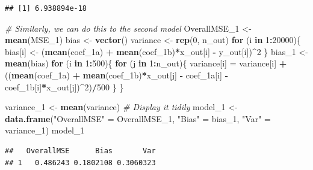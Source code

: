\documentclass[]{article}
\newenvironment{Shaded}{\begin{snugshade}}{\end{snugshade}}
\newcommand{\KeywordTok}[1]{\textcolor[rgb]{0.13,0.29,0.53}{\textbf{#1}}}
\newcommand{\DecValTok}[1]{\textcolor[rgb]{0.00,0.00,0.81}{#1}}
\newcommand{\StringTok}[1]{\textcolor[rgb]{0.31,0.60,0.02}{#1}}
\newcommand{\CommentTok}[1]{\textcolor[rgb]{0.56,0.35,0.01}{\textit{#1}}}
\newcommand{\ControlFlowTok}[1]{\textcolor[rgb]{0.13,0.29,0.53}{\textbf{#1}}}
\newcommand{\OperatorTok}[1]{\textcolor[rgb]{0.81,0.36,0.00}{\textbf{#1}}}
\newcommand{\NormalTok}[1]{#1}
\begin{document}
\begin{verbatim}
## [1] 6.938894e-18
\end{verbatim}

\begin{Shaded}
\begin{Highlighting}[]
\CommentTok{# Similarly, we can do this to the second model}
\NormalTok{OverallMSE_}\DecValTok{1}\NormalTok{ <-}\StringTok{ }\KeywordTok{mean}\NormalTok{(MSE_}\DecValTok{1}\NormalTok{)}
\NormalTok{bias <-}\StringTok{ }\KeywordTok{vector}\NormalTok{()}
\NormalTok{variance <-}\StringTok{ }\KeywordTok{rep}\NormalTok{(}\DecValTok{0}\NormalTok{, n_out)}
\ControlFlowTok{for}\NormalTok{ (i }\ControlFlowTok{in} \DecValTok{1}\OperatorTok{:}\DecValTok{20000}\NormalTok{)\{}
\NormalTok{  bias[i] <-}\StringTok{ }\NormalTok{(}\KeywordTok{mean}\NormalTok{(coef_1a) }\OperatorTok{+}\StringTok{ }\KeywordTok{mean}\NormalTok{(coef_1b)}\OperatorTok{*}\NormalTok{x_out[i] }\OperatorTok{-}\StringTok{ }\NormalTok{y_out[i])}\OperatorTok{^}\DecValTok{2}
\NormalTok{\}}
\NormalTok{bias_}\DecValTok{1}\NormalTok{ <-}\StringTok{ }\KeywordTok{mean}\NormalTok{(bias)}
\ControlFlowTok{for}\NormalTok{ (i }\ControlFlowTok{in} \DecValTok{1}\OperatorTok{:}\DecValTok{500}\NormalTok{)\{}
  \ControlFlowTok{for}\NormalTok{ (j }\ControlFlowTok{in} \DecValTok{1}\OperatorTok{:}\NormalTok{n_out)\{}
\NormalTok{    variance[i] =}\StringTok{ }\NormalTok{variance[i] }\OperatorTok{+}\StringTok{ }\NormalTok{((}\KeywordTok{mean}\NormalTok{(coef_1a) }\OperatorTok{+}\StringTok{ }\KeywordTok{mean}\NormalTok{(coef_1b)}\OperatorTok{*}\NormalTok{x_out[j] }\OperatorTok{-}\StringTok{ }\NormalTok{coef_1a[i] }\OperatorTok{-}\StringTok{ }\NormalTok{coef_1b[i]}\OperatorTok{*}\NormalTok{x_out[j])}\OperatorTok{^}\DecValTok{2}\NormalTok{)}\OperatorTok{/}\DecValTok{500}
\NormalTok{  \}}
\NormalTok{\}}

\NormalTok{variance_}\DecValTok{1}\NormalTok{ <-}\StringTok{ }\KeywordTok{mean}\NormalTok{(variance)}
\CommentTok{# Display it tidily}
\NormalTok{model_}\DecValTok{1}\NormalTok{ <-}\StringTok{ }\KeywordTok{data.frame}\NormalTok{(}\StringTok{"OverallMSE"}\NormalTok{ =}\StringTok{ }\NormalTok{OverallMSE_}\DecValTok{1}\NormalTok{, }\StringTok{"Bias"}\NormalTok{ =}\StringTok{ }\NormalTok{bias_}\DecValTok{1}\NormalTok{, }\StringTok{"Var"}\NormalTok{ =}\StringTok{ }\NormalTok{variance_}\DecValTok{1}\NormalTok{)}
\NormalTok{model_}\DecValTok{1}
\end{Highlighting}
\end{Shaded}

\begin{verbatim}
##   OverallMSE      Bias       Var
## 1   0.486243 0.1802108 0.3060323
\end{verbatim}
\end{document}
